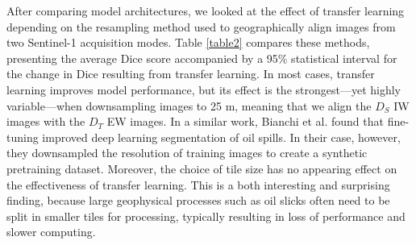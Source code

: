 \documentclass[journal]{IEEEtran}
\begin{document}
After comparing model architectures, we looked at the effect of transfer learning depending on the resampling method used to geographically align images from two Sentinel-1 acquisition modes. Table \ref{table2} 
compares these methods, presenting the average Dice score accompanied by a 95\% statistical interval for the change in Dice resulting from transfer learning. In most cases, transfer learning improves 
model performance, but its effect is the strongest—yet highly variable—when downsampling images to 25 m, meaning that we align the $\mathit{D}_S$ IW images with the $\mathit{D}_T$ EW images. 
In a similar work, Bianchi et al. \cite{bianchiLargeScaleDetectionCategorization2020a} found that fine-tuning improved deep learning segmentation of oil spills. 
In their case, however, they downsampled the resolution of training images to create a synthetic pretraining dataset.
Moreover, the choice of tile size has no appearing effect on the effectiveness of transfer learning. This is a both interesting and surprising finding, because large geophysical processes such as oil slicks 
often need to be split in smaller tiles for processing, typically resulting in loss of performance and slower computing.
\end{document}
